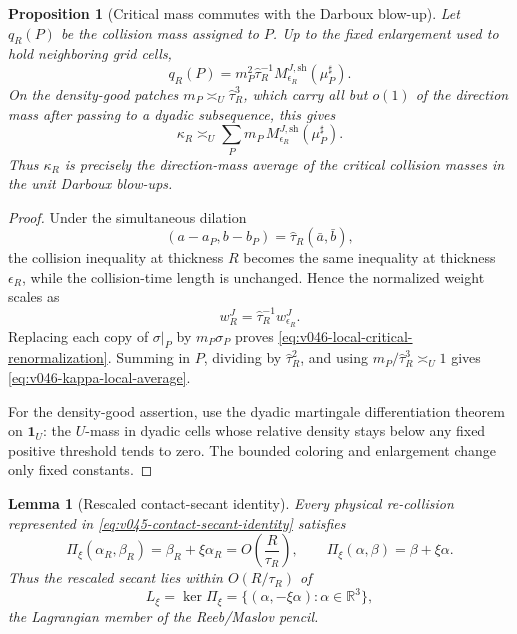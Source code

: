 \documentclass[10pt]{article}
\newtheorem{proposition}[theorem]{Proposition}
\newtheorem{lemma}[theorem]{Lemma}
\newcommand{\R}{\mathbb R}
\begin{document}
\begin{proposition}[Critical mass commutes with the Darboux blow-up]
\label{prop:v046-critical-renormalization}
Let \(q_R(P)\) be the collision mass assigned to \(P\).  Up to the fixed enlargement used to hold
neighboring grid cells,
\begin{equation}
\label{eq:v046-local-critical-renormalization}
\boxed{
q_R(P)
=
m_P^2\widehat\tau_R^{-1}
M_{\epsilon_R}^{J,\mathrm{sh}}(\mu_P^\sharp).
}
\end{equation}
On the density-good patches
\(m_P\asymp_U\widehat\tau_R^3\), which carry all but \(o(1)\) of the direction mass after passing
to a dyadic subsequence, this gives
\begin{equation}
\label{eq:v046-kappa-local-average}
\boxed{
\kappa_R
\asymp_U
\sum_P
m_P\,M_{\epsilon_R}^{J,\mathrm{sh}}(\mu_P^\sharp).
}
\end{equation}
Thus \(\kappa_R\) is precisely the direction-mass average of the critical collision masses in the
unit Darboux blow-ups.
\end{proposition}

\begin{proof}
Under the simultaneous dilation
\[
(a-a_P,b-b_P)
=
\widehat\tau_R(\bar a,\bar b),
\]
the collision inequality at thickness \(R\) becomes the same inequality at thickness
\(\epsilon_R\), while the collision-time length is unchanged.  Hence the normalized weight scales
as
\[
w_R^J
=
\widehat\tau_R^{-1}w_{\epsilon_R}^J.
\]
Replacing each copy of \(\sigma|_P\) by \(m_P\sigma_P\) proves
\eqref{eq:v046-local-critical-renormalization}.  Summing in \(P\), dividing by
\(\widehat\tau_R^2\), and using
\(m_P/\widehat\tau_R^3\asymp_U1\) gives
\eqref{eq:v046-kappa-local-average}.

For the density-good assertion, use the dyadic martingale differentiation theorem on
\(\mathbf 1_U\): the \(U\)-mass in dyadic cells whose relative density stays below any fixed
positive threshold tends to zero.  The bounded coloring and enlargement change only fixed
constants.
\end{proof}

\begin{lemma}[Rescaled contact-secant identity]
\label{lem:v046-rescaled-contact-secant}
Every physical re-collision represented in
\eqref{eq:v045-contact-secant-identity} satisfies
\begin{equation}
\label{eq:v046-rescaled-contact-secant}
\boxed{
\Pi_\xi(\alpha_R,\beta_R)
=
\beta_R+\xi\alpha_R
=
O\!\left(\frac{R}{\tau_R}\right),
\qquad
\Pi_\xi(\alpha,\beta)=\beta+\xi\alpha.
}
\end{equation}
Thus the rescaled secant lies within \(O(R/\tau_R)\) of
\[
L_\xi=\ker\Pi_\xi=\{(\alpha,-\xi\alpha):\alpha\in\R^3\},
\]
the Lagrangian member of the Reeb/Maslov pencil.
\end{lemma}
\end{document}
